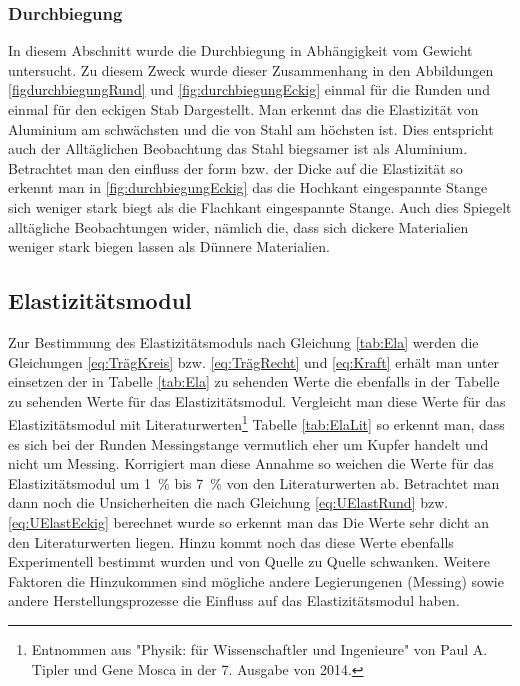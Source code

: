 \subsubsection*{Durchbiegung}
In diesem Abschnitt wurde die Durchbiegung in Abhängigkeit vom Gewicht untersucht. Zu diesem Zweck wurde dieser Zusammenhang in den Abbildungen \ref{figdurchbiegungRund} und \ref{fig:durchbiegungEckig} einmal für die Runden und einmal für den eckigen Stab Dargestellt.
Man erkennt das die Elastizität von Aluminium am schwächsten und die von Stahl am höchsten ist. Dies entspricht auch der Alltäglichen Beobachtung das Stahl biegsamer ist als Aluminium.
Betrachtet man den einfluss der form bzw. der Dicke auf die Elastizität so erkennt man in \ref{fig:durchbiegungEckig} das die Hochkant eingespannte Stange sich weniger stark biegt als die Flachkant eingespannte Stange. Auch dies Spiegelt alltägliche Beobachtungen wider, nämlich die, dass sich dickere Materialien weniger stark biegen lassen als Dünnere Materialien.

\subsection{Elastizitätsmodul}

Zur Bestimmung des Elastizitätsmoduls nach Gleichung \ref{tab:Ela} werden die Gleichungen \ref{eq:TrägKreis} bzw. \ref{eq:TrägRecht} und \ref{eq:Kraft} erhält man unter einsetzen der in Tabelle \ref{tab:Ela} zu sehenden Werte die ebenfalls in der Tabelle zu sehenden Werte für das Elastizitätsmodul.
Vergleicht man diese Werte für das Elastizitätsmodul mit Literaturwerten\footnote{Entnommen aus "Physik: für Wissenschaftler und Ingenieure" von Paul A. Tipler und Gene Mosca in der 7. Ausgabe von 2014.} Tabelle \ref{tab:ElaLit} so erkennt man, dass es sich bei der Runden Messingstange vermutlich eher um Kupfer handelt und nicht um Messing. Korrigiert man diese Annahme so weichen die Werte für das Elastizitätsmodul um \SI{1}{\percent} bis \SI{7}{\percent} von den Literaturwerten ab. Betrachtet man dann noch die Unsicherheiten die nach Gleichung \ref{eq:UElastRund} bzw. \ref{eq:UElastEckig} berechnet wurde so erkennt man das Die Werte sehr dicht an den Literaturwerten liegen. Hinzu kommt noch das diese Werte ebenfalls Experimentell bestimmt wurden und von Quelle zu Quelle schwanken. Weitere Faktoren die Hinzukommen sind mögliche andere Legierungenen (Messing) sowie andere Herstellungsprozesse die Einfluss auf das Elastizitätsmodul haben. 

